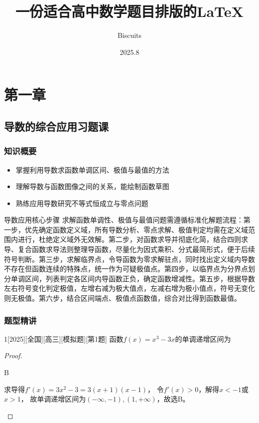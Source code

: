 \documentclass[
noshowanswers,        %
answercolor=red,    %
paper=a4,           %
sectioncolor=cyan,  %
subsectioncolor=cyan,
exercisecolor=orange, %
examplecolor=cyan,    %
bianshicolor=purple  %
]{biscuits}
\newenvironment{introduction}{%
	\begin{tcolorbox}[
		colback=orange!5,       %
		colframe=orange!30,     %
		title=内容提要,        %
		fonttitle=\bfseries,  %
		left=2mm, right=2mm,
		top=2mm, bottom=2mm,
		breakable             %
		]
		\renewcommand{\labelitemi}{$\square$} %
		\begin{itemize}
			\setlength{\itemsep}{2pt} %
			\setlength{\parskip}{0pt}
		}{%
		\end{itemize}
	\end{tcolorbox}
}
\begin{document}
	
	\title{ 一份适合高中数学题目排版的\LaTeX}
	\author{Biscuits}
	\date{2025.8}
	\maketitle
	
	\tableofcontents
	
	\newpage
	\chapter{第一章}
\section{导数的综合应用习题课}
\subsection{知识概要}
\begin{introduction}
	\item 掌握利用导数求函数单调区间、极值与最值的方法
	\item 理解导数与函数图像之间的关系，能绘制函数草图
	\item 熟练应用导数研究不等式恒成立与零点问题
\end{introduction}
\begin{knowledge}{导数应用核心步骤}
	求解函数单调性、极值与最值问题需遵循标准化解题流程：第一步，优先确定函数定义域，所有导数分析、零点求解、极值判定均需在定义域范围内进行，杜绝定义域外无效解。第二步，对函数求导并彻底化简，结合四则求导、复合函数求导法则整理导函数，尽量化为因式乘积、分式最简形式，便于后续符号判断。第三步，求解临界点，令导函数为零求解驻点，同时找出定义域内导数不存在但函数连续的特殊点，统一作为可疑极值点。第四步，以临界点为分界点划分单调区间，列表判定各区间内导函数正负，确定函数增减性。第五步，根据导数左右符号变化判定极值，左增右减为极大值点，左减右增为极小值点，符号无变化则无极值。第六步，结合区间端点、极值点函数值，综合对比得到函数最值。

    
\end{knowledge}

	\subsection{题型精讲}
\begin{example}{1}[2025][全国][高三][模拟题][第1题]
	函数$f(x)=x^3-3x$的单调递增区间为\blankbox
	\begin{choices}
	\end{choices}
	\begin{proof}
		\begin{answer}
			B
		\end{answer}
		\begin{solutions}
			求导得$f'(x)=3x^2-3=3(x+1)(x-1)$，
			令$f'(x)>0$，解得$x<-1$或$x>1$，
			故单调递增区间为$(-\infty,-1),(1,+\infty)$，故选B。
		\end{solutions}
	\end{proof}
\end{example}
\end{document}
